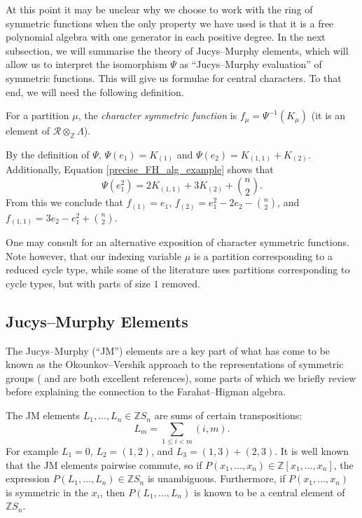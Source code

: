 \documentclass[ALCO,Unicode]{cedram}
\begin{document}
At this point it may be unclear why we choose to work with the ring of symmetric functions when the only property we have used is that it is a free polynomial algebra with one generator in each positive degree. In the next subsection, we will summarise the theory of Jucys--Murphy elements, which will allow us to interpret the isomorphism $\Psi$ as ``Jucys--Murphy evaluation'' of symmetric functions. This will give us formulae for central characters. To that end, we will need the following definition.
\begin{definition} \label{char_sym_fun_def}
For a partition $\mu$, the \emph{character symmetric function} is $f_\mu = \Psi^{-1}(K_\mu)$ \textup{(}it is an element of $\mathcal{R} \otimes_{\mathbb{Z}} \Lambda$\textup{)}.
\end{definition}
\begin{example} \label{char_sym_fn_example}
By the definition of $\Psi$, $\Psi(e_1) = K_{(1)}$ and $\Psi(e_2) = K_{(1,1)} + K_{(2)}$. Additionally, Equation \eqref{precise_FH_alg_example} shows that 
\[
\Psi(e_1^2) = 2 K_{(1,1)} + 3K_{(2)} + \binom{n}{2}.
\]
From this we conclude that $f_{(1)} = e_1$, $f_{(2)} = e_1^2 - 2e_2 - \binom{n}{2}$, and $f_{(1,1)} = 3e_2 - e_1^2 + \binom{n}{2}$.
\end{example}


One may consult  \cite[Section 5.4]{CST} for an alternative exposition of character symmetric functions. Note however, that our indexing variable $\mu$ is a partition corresponding to a reduced cycle type, while some of the literature uses partitions corresponding to cycle types, but with parts of size $1$ removed.

\subsection{Jucys--Murphy Elements} The Jucys--Murphy (``JM'') elements are a key part of what has come to be known as the Okounkov--Vershik approach to the representations of symmetric groups (\cite{OkounkovVershik} and \cite{Kleshchev} are both excellent references), some parts of which we briefly review before explaining the connection to the Farahat--Higman algebra.

The JM elements $L_1, \ldots, L_n \in \mathbb{Z}S_n$ are sums of certain transpositions:
\[
L_m = \sum_{1\leq i < m} (i,m).
\]
For example $L_1 = 0$, $L_2 = (1,2)$, and $L_3 = (1,3)+(2,3)$. It is well known that the JM elements pairwise commute, so if $P(x_1, \ldots, x_n) \in \mathbb{Z}[x_1, \ldots, x_n]$, the expression $P(L_1, \ldots, L_n) \in \mathbb{Z}S_n$ is unambiguous. Furthermore, if $P(x_1, \ldots, x_n)$ is symmetric in the $x_i$, then $P(L_1, \ldots, L_n)$ is known to be a central element of $\mathbb{Z}S_n$.
\end{document}
